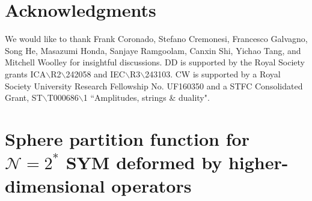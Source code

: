 \documentclass[aps,prl,twocolumn, longbibliography,footinbib,superscriptaddress, preprintnumbers]{revtex4-1}
\newcommand{\<}{\langle}
\renewcommand{\>}{\rangle}
\begin{document}
\vspace{-0.58cm}
\section*{Acknowledgments}
\vspace{-0.2cm}
{\small
 We would like to thank  Frank Coronado, Stefano Cremonesi, Francesco Galvagno, Song He,  Masazumi Honda, Sanjaye Ramgoolam, Canxin Shi, Yichao Tang, and Mitchell Woolley for insightful discussions.
   DD is supported by
the Royal Society grants ICA$\backslash$R2$\backslash$242058 and IEC$\backslash$R3$\backslash$243103. CW is supported by a Royal Society University Research Fellowship No. UF160350 and a STFC Consolidated Grant, ST$\backslash$T000686$\backslash$1 ``Amplitudes, strings \& duality".


\onecolumngrid
\setcounter{secnumdepth}{2}

\appendix


\section{Sphere partition function for $\mathcal{N}=2^*$ SYM deformed by higher-dimensional operators} \label{eq:part-fun}

}
\end{document}
